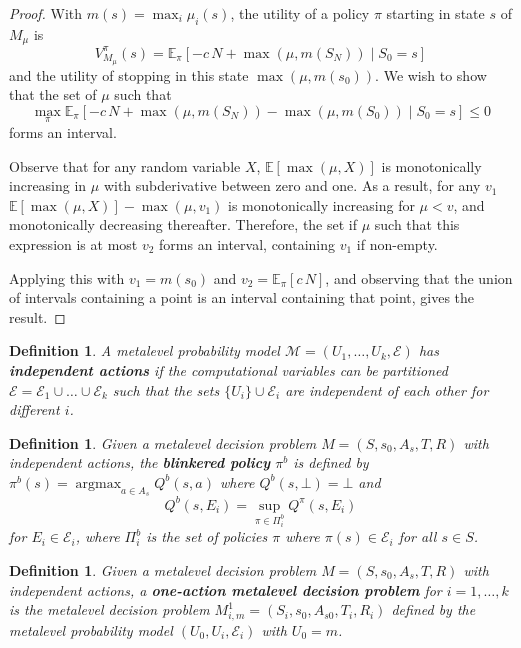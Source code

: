 \documentclass[]{article}
\newcommand {\IE} {\ensuremath {\mathbb{E}}}
\newcommand {\term}[1] {\textbf{#1}}
\newcommand {\Evidence} {\mathcal{E}}
\newcommand {\given} {\mid} %
\DeclareMathOperator*{\argmax}{argmax}
\newtheorem{dfn}[thm]{Definition}
\begin{document}
	\begin{hiddenproof}
		\begin{proof}
		With $m(s) = \max_i\mu_i(s)$, the utility of a policy $\pi$ starting in state $s$ of $M_\mu$ is
		\[
			V^\pi_{M_\mu}(s) = \IE_{\pi}[-c\,N + \max(\mu,m(S_N)) \given S_0=s]
		\]
		and the utility of stopping in this state $\max(\mu,m(s_0))$.
		We wish to show that the set of $\mu$ such that
		\[
			\max_\pi \IE_{\pi}[-c\,N + \max(\mu,m(S_N)) - \max(\mu,m(S_0)) \given S_0=s] \le 0
		\]
		forms an interval.  

		Observe that for any random variable $X$, 
			$\IE[\max(\mu,X)]$ is monotonically increasing in $\mu$ with subderivative between zero and one.
		As a result, for any $v_1$
			$\IE[\max(\mu,X)] - \max(\mu,v_1)$ 
			is monotonically increasing for $\mu<v$, 
			and monotonically decreasing thereafter.
		Therefore, the set if $\mu$ such that this expression is at most $v_2$ forms an interval, containing $v_1$ if non-empty.

		Applying this with $v_1 = m(s_0)$ and $v_2=\IE_{\pi}[c\,N]$, and observing that the union of intervals containing
		a point is an interval containing that point, gives the result.
		\end{proof}	
	\end{hiddenproof}


	\begin{dfn}\label{dfn:independent-actions}
		A metalevel probability model $\mathcal{M}=(U_1,\dots,U_k,\Evidence)$ 
		has \term{independent actions} if the computational variables can be partitioned 
		$\Evidence = \Evidence_1\cup\dots\cup\Evidence_k$ such that
		the sets $\{U_i\}\cup\Evidence_i$ are independent of each other for different $i$.	
	\end{dfn}

	\begin{dfn}\label{dfn:blinkered}
		Given a metalevel decision problem $M=(S,s_0,A_s,T,R)$ with independent actions,
		the \term{blinkered policy} $\pi^b$ is defined by $\pi^b(s) = \argmax_{a\in A_s} Q^b(s,a)$ where
		$Q^b(s,\bot) = \bot$ and
		\begin{equation}\label{eq:blinkered}
			Q^b(s,E_i) = \sup_{\pi\in\Pi^b_i} Q^\pi(s,E_i)
		\end{equation}
		for $E_i\in\Evidence_i$, where $\Pi^b_i$ is the set of policies $\pi$ where $\pi(s)\in\Evidence_i$ for all $s\in S$.
	\end{dfn}

	\begin{dfn}\label{dfn:one-action}
		Given a metalevel decision problem $M=(S,s_0,A_s,T,R)$ with independent actions,
		a \term{one-action metalevel decision problem} for $i=1,\dots,k$ is the metalevel decision
		problem $M^1_{i,m} = (S_i,s_0,A_{s0},T_i,R_i)$ defined by the metalevel probability
		model $(U_0,U_i,\Evidence_i)$ with $U_0=m$.
	\end{dfn}
\end{document}
